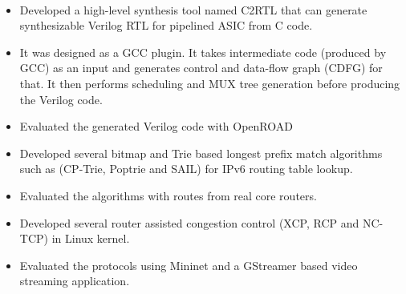 \documentclass[10pt,a4paper,ragged2e]{altacv}
\begin{document}
\\







\begin{itemize}
	\item Developed a high-level synthesis tool named C2RTL that can generate synthesizable Verilog RTL for pipelined ASIC from C code.
	\item It was designed as a GCC plugin. It takes intermediate code (produced by GCC) as an input and generates control and data-flow graph (CDFG) for that. It then performs scheduling and MUX tree generation before producing the Verilog code.
	\item Evaluated the generated Verilog code with OpenROAD 
\end{itemize}
\smallskip
{}
\begin{itemize}
	\item Developed several bitmap and Trie based longest prefix match algorithms such as (CP-Trie, Poptrie and SAIL) for IPv6 routing table lookup. 
	\item Evaluated the algorithms with routes from real core routers.
\end{itemize}
\smallskip
{}
\begin{itemize}
	\item Developed several router assisted congestion control (XCP, RCP and NC-TCP)  in Linux kernel.
	\item Evaluated the protocols using Mininet and a GStreamer based video streaming application. 
\end{itemize}
\end{document}
